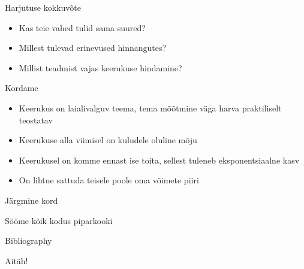\documentclass{beamer}
\begin{document}
\begin{frame}{Harjutuse kokkuvõte}
	\begin{itemize}
		\item Kas teie vahed tulid sama suured?
		\item Millest tulevad erinevused hinnangutes?
		\item Millist teadmist vajas keerukuse hindamine?
	\end{itemize}
\end{frame}

\begin{frame}{Kordame}
	\begin{itemize}
		\item Keerukus on laialivalguv teema, tema mõõtmine väga harva praktiliselt teostatav 
		\item Keerukuse alla viimisel on kuludele oluline mõju
		\item Keerukusel on komme ennast ise toita, sellest tuleneb eksponentsiaalne kasv
		\item On lihtne sattuda teisele poole oma võimete piiri
	\end{itemize}
\end{frame}

\begin{frame}{Järgmine kord}
\begin{center}
Sööme kõik kodus piparkooki
\end{center}
\end{frame}

\begin{frame}{Bibliography}
	
	
\end{frame}

\begin{frame}[standout]
Aitäh!
\end{frame}
\end{document}
